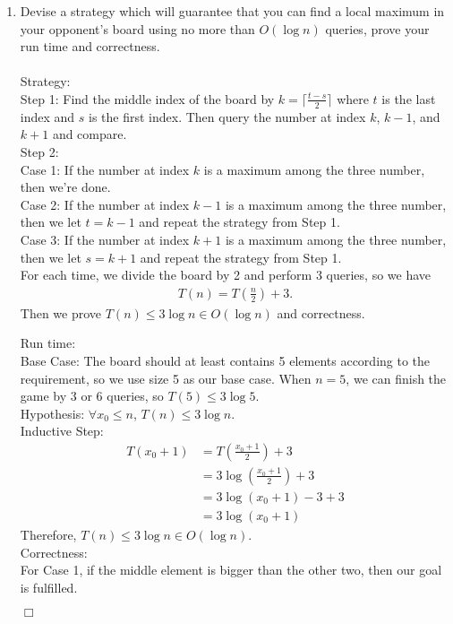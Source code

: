 \documentclass[10pt]{article}
\newenvironment{proof}{\par\noindent{\it Proof.}\hspace*{1em}}{$\Box$\bigskip}
\begin{document}
\begin{enumerate}
    \item Devise a strategy which will guarantee that you can find a local maximum in your opponent's board using no more than $O(\log n)$ queries, prove your run time and correctness.\\
    \\
    Strategy:\\
    Step 1: Find the middle index of the board by $k=\lceil \frac{t-s}{2} \rceil$ where $t$ is the last index and $s$ is the first index. Then query the number at index $k$, $k-1$, and $k+1$ and compare. \\
    Step 2: \\
    Case 1: If the number at index $k$ is a maximum among the three number, then we're done.\\
    Case 2: If the number at index $k-1$ is a maximum among the three number, then we let $t=k-1$ and repeat the strategy from Step 1.\\
    Case 3: If the number at index $k+1$ is a maximum among the three number, then we let $s=k+1$ and repeat the strategy from Step 1.\\
    For each time, we divide the board by 2 and perform 3 queries, so we have 
    \begin{align}
    T(n)=T(\frac{n}{2})+3.
    \end{align}
    Then we prove $T(n) \leq 3\log n \in O(\log n)$ and correctness.\\
    \begin{proof}
    Run time:\\
    Base Case: The board should at least contains 5 elements according to the requirement, so we use size 5 as our base case. When $n=5$, we can finish the game by 3 or 6 queries, so $T(5) \leq 3\log 5$.\\
    Hypothesis: $\forall x_0 \leq n$, $T(n) \leq 3\log n$.\\
    Inductive Step: 
    \begin{align}
        T(x_0+1)&=T(\frac{x_0+1}{2})+3\\
                &=3\log (\frac{x_0+1}{2})+3\\
                &=3\log (x_0+1)-3+3\\
                &=3\log(x_0+1)
    \end{align}
    Therefore, $T(n) \leq 3\log n \in O(\log n)$.\\
    Correctness:\\
    For Case 1, if the middle element is bigger than the other two, then our goal is fulfilled. 

\end{proof}
\end{enumerate}
\end{document}
